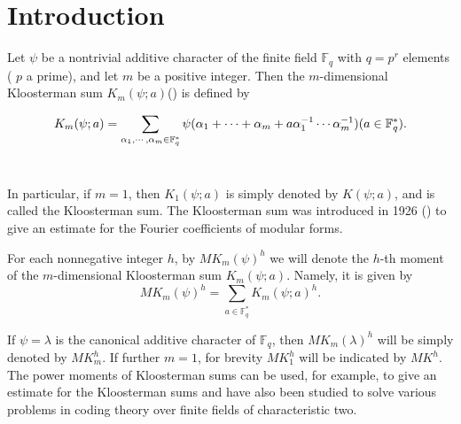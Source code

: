 \documentclass[a4,12pt]{elsart}
\begin{document}
\begin{minipage}{\textwidth}
\section {Introduction}

Let  $\psi$ be a nontrivial additive character of the finite
field ${\mathbb{F}}_q$ with $q = p^r$ elements ( $p$ a prime), and let $m$ be
a positive integer. Then the $m$-dimensional  Kloosterman sum
$K_m(\psi;a)$(\cite{RH}) is defined by

\begin{equation*}
 K_{m}(\psi;a)=\sum_{\alpha_{1},\cdots,\alpha_{m} \in
{\mathbb{F}}_{q}^{*}}\psi(\alpha_{1}+\cdots+\alpha_{m}+a\alpha_{1}^{-1}\cdots\alpha_{m}^{-1})\\
(a \in {\mathbb{F}}_{q}^{*}).
\end{equation*}\\

\end{minipage}
\bigskip

In particular, if $m=1$, then $K_{1}(\psi;a)$ is simply denoted by
$K(\psi;a)$, and is called the Kloosterman sum. The Kloosterman sum
was introduced in 1926 (\cite{HDK}) to give an estimate for the
Fourier coefficients of modular forms.

For each nonnegative integer $h$, by $MK_{m}(\psi)^{h}$ we will
denote the $h$-th moment of the $m$-dimensional Kloosterman sum
$K_{m}(\psi;a)$. Namely, it is given by
\begin{equation*}
 MK_{m}(\psi)^{h}=\sum_{a \in {\mathbb{F}}_{q}^{*}}K_{m}(\psi;a)^{h}.
 \end{equation*}

If $\psi=\lambda$ is the canonical additive character of
$\mathbb{F}_{q}$, then $MK_{m}(\lambda)^{h}$ will be simply denoted
by $MK_{m}^{h}$. If further $m=1$, for brevity $MK_{1}^{h}$ will be
indicated by $MK^{h}$. The power moments of Kloosterman sums can be
used, for example, to give an estimate for the Kloosterman sums and
have also been studied to solve various problems in coding theory
over finite fields of characteristic two.
\end{document}

